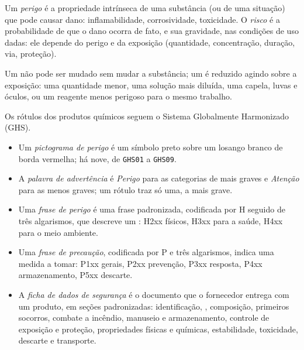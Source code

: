 \begin{definition}\label{def:b1:lab-techniques-1:hazard}
Um \emph{perigo} é a propriedade intrínseca de uma substância
(ou de uma situação) que pode causar dano: inflamabilidade, corrosividade,
toxicidade. O \emph{risco} é a probabilidade de que o dano
ocorra de fato, e sua gravidade, nas condições de uso dadas: ele depende
do perigo e da exposição (quantidade, concentração, duração, via,
proteção).
\end{definition}

Um  não pode ser mudado sem mudar a substância; um  é reduzido
agindo sobre a exposição: uma quantidade menor, uma solução mais diluída,
uma capela, luvas e óculos, ou um reagente menos perigoso para o mesmo
trabalho.

\begin{definition}\label{def:b1:lab-techniques-1:ghs}
Os rótulos dos produtos químicos seguem o Sistema Globalmente Harmonizado (GHS).
\begin{itemize}
  \item Um \emph{pictograma de perigo} é um
        símbolo preto sobre um losango branco de borda vermelha; há nove,
        de \texttt{GHS01} a \texttt{GHS09}.
  \item A \emph{palavra de advertência} é \emph{Perigo} para
        as categorias de  mais graves e \emph{Atenção} para as menos
        graves; um rótulo traz só uma, a mais grave.
  \item Uma \emph{frase de perigo} é uma frase
        padronizada, codificada por H seguido de três algarismos, que
        descreve um : H2xx  físicos, H3xx  para a
        saúde, H4xx  para o meio ambiente.
  \item Uma \emph{frase de precaução},
        codificada por P e três algarismos, indica uma medida a tomar: P1xx
        gerais, P2xx prevenção, P3xx resposta, P4xx armazenamento, P5xx
        descarte.
  \item A \emph{ficha de dados de segurança} é
        o documento que o fornecedor entrega com um produto, em seções
        padronizadas: identificação, , composição, primeiros
        socorros, combate a incêndio, manuseio e armazenamento, controle
        de exposição e proteção, propriedades físicas e químicas,
        estabilidade, toxicidade, descarte e transporte.
\end{itemize}
\end{definition}

